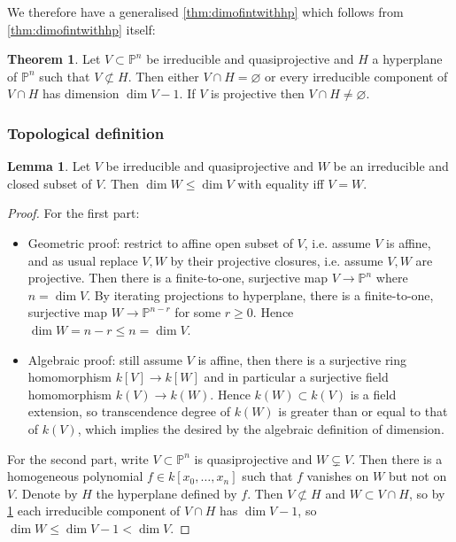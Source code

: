 \documentclass{article}
\newcommand{\p}{\mathbb{P}}
\theoremstyle{definition}
\newtheorem{thm}[defn]{Theorem}
\newtheorem{lemma}[defn]{Lemma}
\begin{document}
We therefore have a generalised \ref{thm:dimofintwithhp} which follows from \ref{thm:dimofintwithhp} itself:
\begin{thm}
\label{thm:gendimofintwithhp}
Let $V\subset\p^n$ be irreducible and quasiprojective and $H$ a hyperplane of $\p^n$ such that $V\not\subset H$. Then either $V\cap H=\varnothing$ or every irreducible component of $V\cap H$ has dimension $\dim V-1$. If $V$ is projective then $V\cap H\neq\varnothing$.
\end{thm}

\subsubsection{Topological definition}
\begin{lemma}
Let $V$ be irreducible and quasiprojective and $W$ be an irreducible and closed subset of $V$. Then $\dim W\leq\dim V$ with equality iff $V=W$.
\end{lemma}
\begin{proof}
For the first part:
\begin{itemize}
\item Geometric proof: restrict to affine open subset of $V$, i.e. assume $V$ is affine, and as usual replace $V,W$ by their projective closures, i.e. assume $V,W$ are projective. Then there is a finite-to-one, surjective map $V\rightarrow\p^n$ where $n=\dim V$. By iterating projections to hyperplane, there is a finite-to-one, surjective map $W\rightarrow\p^{n-r}$ for some $r\geq 0$. Hence $\dim W=n-r\leq n=\dim V$.
\item Algebraic proof: still assume $V$ is affine, then there is a surjective ring homomorphism $k[V]\rightarrow k[W]$ and in particular a surjective field homomorphism $k(V)\rightarrow k(W)$. Hence $k(W)\subset k(V)$ is a field extension, so transcendence degree of $k(W)$ is greater than or equal to that of $k(V)$, which implies the desired by the algebraic definition of dimension.
\end{itemize}
For the second part, write $V\subset\p^n$ is quasiprojective and $W\subsetneq V$. Then there is a homogeneous polynomial $f\in k[x_0,\ldots,x_n]$ such that $f$ vanishes on $W$ but not on $V$. Denote by $H$ the hyperplane defined by $f$. Then $V\not\subset H$ and $W\subset V\cap H$, so by \ref{thm:gendimofintwithhp} each irreducible component of $V\cap H$ has $\dim V-1$, so $\dim W\leq \dim V-1<\dim V$.
\end{proof}
\end{document}
